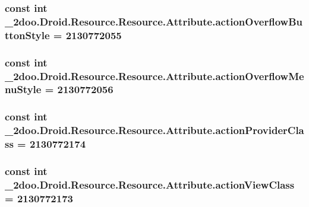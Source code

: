 \hypertarget{class__2doo_1_1_droid_1_1_resource_1_1_attribute_5e68d80237718e5d8939d148ffd82835}{
\subsubsection[{actionOverflowButtonStyle}]{\setlength{\rightskip}{0pt plus 5cm}const int \_\-2doo.Droid.Resource.Resource.Attribute.actionOverflowButtonStyle = 2130772055}}
\label{class__2doo_1_1_droid_1_1_resource_1_1_attribute_5e68d80237718e5d8939d148ffd82835}


\hypertarget{class__2doo_1_1_droid_1_1_resource_1_1_attribute_d0e7a728f62efe9fbfed895fff6c3aa9}{
\subsubsection[{actionOverflowMenuStyle}]{\setlength{\rightskip}{0pt plus 5cm}const int \_\-2doo.Droid.Resource.Resource.Attribute.actionOverflowMenuStyle = 2130772056}}
\label{class__2doo_1_1_droid_1_1_resource_1_1_attribute_d0e7a728f62efe9fbfed895fff6c3aa9}


\hypertarget{class__2doo_1_1_droid_1_1_resource_1_1_attribute_84175820713be0f9218346d5b70f70b1}{
\subsubsection[{actionProviderClass}]{\setlength{\rightskip}{0pt plus 5cm}const int \_\-2doo.Droid.Resource.Resource.Attribute.actionProviderClass = 2130772174}}
\label{class__2doo_1_1_droid_1_1_resource_1_1_attribute_84175820713be0f9218346d5b70f70b1}


\hypertarget{class__2doo_1_1_droid_1_1_resource_1_1_attribute_62258d76093aaca263d08bcb520032e3}{
\subsubsection[{actionViewClass}]{\setlength{\rightskip}{0pt plus 5cm}const int \_\-2doo.Droid.Resource.Resource.Attribute.actionViewClass = 2130772173}}
\label{class__2doo_1_1_droid_1_1_resource_1_1_attribute_62258d76093aaca263d08bcb520032e3}


